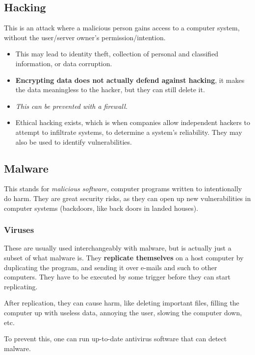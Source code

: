 \documentclass[../main.tex]{subfiles}
\begin{document}
\subsection{Hacking}

This is an attack where a malicious person gains access to a computer system, without the user/server owner's permission/intention.
\begin{itemize}
    \item This may lead to identity theft, collection of personal and classified information, or data corruption. 
    \item \textbf{Encrypting data does not actually defend against hacking}, it makes the data meaningless to the hacker, but they can still delete it.
    \item \emph{This can be prevented with a firewall.}
    \item Ethical hacking exists, which is when companies allow independent hackers to attempt to infiltrate systems, to determine a system's reliability. They may also be used to identify vulnerabilities.
\end{itemize}

\subsection{Malware}

This stands for \emph{malicious software,} computer programs written to intentionally do harm. They are great security risks, as they can open up new vulnerabilities in computer systems (backdoors, like back doors in landed houses).

\subsubsection{Viruses}

These are usually used interchangeably with malware, but is actually just a subset of what malware is. They \textbf{replicate themselves} on a host computer by duplicating the program, and sending it over e-mails and such to other computers. They have to be executed by some trigger before they can start replicating.

After replication, they can cause harm, like deleting important files, filling the computer up with useless data, annoying the user, slowing the computer down, etc.

To prevent this, one can run up-to-date antivirus software that can detect malware.
\end{document}
